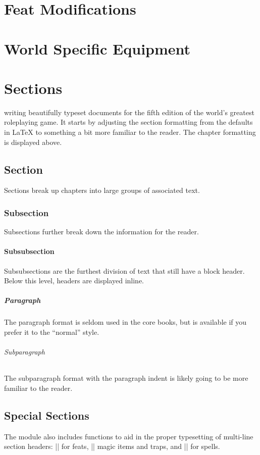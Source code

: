 \documentclass[letterpaper,twocolumn,openany,nodeprecatedcode]{dndbook}
\begin{document}
\chapter{Feat Modifications}


\chapter{World Specific Equipment}


\chapter{Sections}

 writing beautifully typeset documents for the fifth edition of the world's greatest roleplaying game. It starts by adjusting the section formatting from the defaults in \LaTeX{} to something a bit more familiar to the reader. The chapter formatting is displayed above.

\section{Section}
Sections break up chapters into large groups of associated text.

\subsection{Subsection}
Subsections further break down the information for the reader.

\subsubsection{Subsubsection}
Subsubsections are the furthest division of text that still have a block header. Below this level, headers are displayed inline.

\paragraph{Paragraph}
The paragraph format is seldom used in the core books, but is available if you prefer it to the ``normal'' style.

\subparagraph{Subparagraph}
The subparagraph format with the paragraph indent is likely going to be more familiar to the reader.

\section{Special Sections}
The module also includes functions to aid in the proper typesetting of multi-line section headers: |\DndFeatHeader| for feats, |\DndItemHeader| magic items and traps, and |\DndSpellHeader| for spells.
\end{document}

